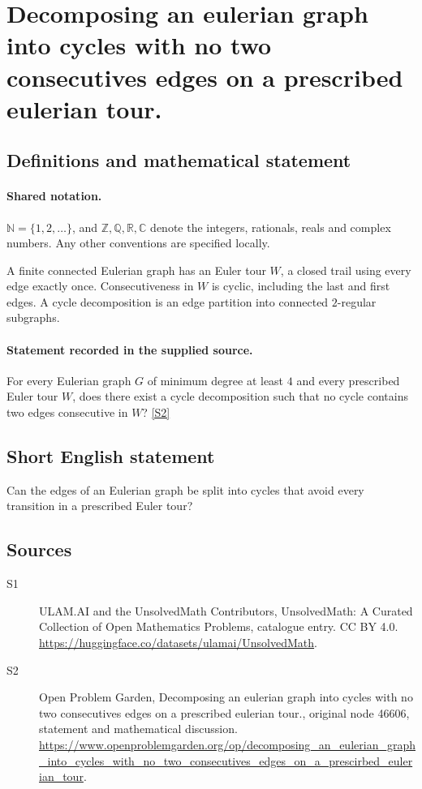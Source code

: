 \documentclass[11pt]{article}
\newcommand{\sref}[2]{\hyperlink{source:#1:#2}{[S#2]}}
\begin{document}
\section{Decomposing an eulerian graph into cycles with no two consecutives edges on a prescribed eulerian tour.}\label{statement}

\subsection{Definitions and mathematical statement}

\paragraph{Shared notation.}$\mathbb N=\{1,2,\ldots\}$, and $\mathbb Z,\mathbb Q,\mathbb R,\mathbb C$ denote the integers, rationals, reals and complex numbers. Any other conventions are specified locally.


A finite connected Eulerian graph has an Euler tour $W$, a closed trail using every edge exactly once. Consecutiveness in $W$ is cyclic, including the last and first edges. A cycle decomposition is an edge partition into connected $2$-regular subgraphs.
\paragraph{Statement recorded in the supplied source.}
For every Eulerian graph $G$ of minimum degree at least $4$ and every prescribed Euler tour $W$, does there exist a cycle decomposition such that no cycle contains two edges consecutive in $W$? \sref{statement}{2}
\subsection{Short English statement}
Can the edges of an Eulerian graph be split into cycles that avoid every transition in a prescribed Euler tour?
\subsection{Sources}
\begin{description}
\item[\hypertarget{source:statement:1}{S1}] ULAM.AI and the UnsolvedMath Contributors, UnsolvedMath: A Curated Collection of Open Mathematics Problems, catalogue entry. CC BY 4.0. \url{https://huggingface.co/datasets/ulamai/UnsolvedMath}.
\item[\hypertarget{source:statement:2}{S2}] Open Problem Garden, Decomposing an eulerian graph into cycles with no two consecutives edges on a prescribed eulerian tour., original node 46606, statement and mathematical discussion. \url{https://www.openproblemgarden.org/op/decomposing_an_eulerian_graph_into_cycles_with_no_two_consecutives_edges_on_a_prescirbed_eulerian_tour}.
\end{description}
\label{end:statement}
\end{document}
